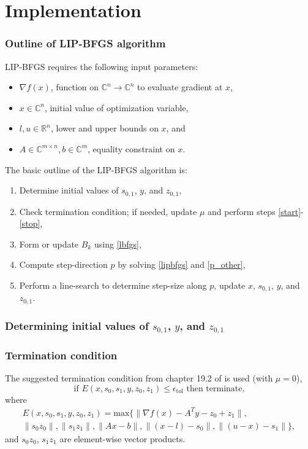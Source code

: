 \documentclass{article}
\begin{document}
\part{Implementation}
\section{Outline of LIP-BFGS algorithm}
LIP-BFGS requires the following input parameters:
\begin{itemize}
    \item $\nabla f(x)$,  function on $\mathbb{C}^n \to \mathbb{C}^n$
        to evaluate gradient at $x$,
    \item $x \in \mathbb{C}^n$,  initial value of optimization variable,
    \item $l, u \in \mathbb{R}^n$,  lower and upper bounds on $x$, and
    \item $A \in \mathbb{C}^{m \times n}, b \in \mathbb{C}^m$, 
        equality constraint on $x$.
\end{itemize}

The basic outline of the LIP-BFGS algorithm is:
\begin{enumerate}
    \item Determine initial values of $s_{0,1}$, $y$, and $z_{0,1}$,
    \item Check termination condition; if needed,
        update $\mu$ and perform steps \ref{start}-\ref{stop},

    \item Form or update $B_k$ using \eqref{lbfgs}, \label{start}
    \item Compute step-direction $p$ by solving 
        \eqref{lipbfgs} and \eqref{p_other},
    \item Perform a line-search to determine step-size along $p$,
        update $x$, $s_{0,1}$, $y$, and $z_{0,1}$. \label{stop}
\end{enumerate}

\section{Determining initial values of $s_{0,1}$, $y$, and $z_{0,1}$}
\section{Termination condition}
The suggested termination condition from chapter 19.2 of \cite{NW04}
    is used (with $\mu = 0$),
    \begin{equation}
    \text{if } E(x, s_0, s_1, y, z_0, z_1) \le \epsilon_\text{tol}
    \text{ then terminate,}
    \end{equation}
    where
    \begin{multline}
    E(x, s_0, s_1, y, z_0, z_1) = \text{max}\{ 
        \| \nabla f(x) - A^T y - z_0 + z_1 \|, \\
        \| s_0 z_0 \|, 
        \| s_1 z_1 \|, 
        \| A x - b \|, 
        \|(x - l) - s_0 \|, 
        \|(u - x) - s_1 \| \},
    \end{multline}
    and $s_0 z_0$, $s_1 z_1$ are element-wise vector products.
\end{document}
